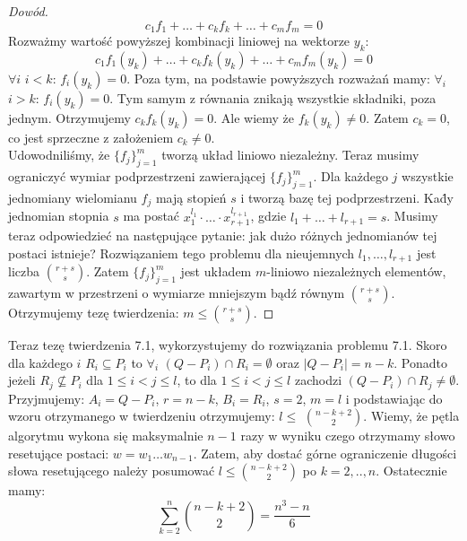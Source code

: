 \documentclass[12pt,a4paper]{article}
\begin{document}
\begin{proof}[Dow\'od]
\begin{equation}
 c_{1}f_{1}+\ldots+c_{k}f_{k}+\ldots+c_{m}f_{m}=0
\end{equation} 
Rozwa\.zmy warto\'s\'c powy\.zszej kombinacji liniowej na wektorze $y_{k}$: 
\begin{equation}
c_{1}f_{1}(y_{k})+\ldots+c_{k}f_{k}(y_{k})+\ldots+c_{m}f_{m}(y_{k})=0 
\end{equation}
$\forall i$ $i<k$: $f_{i}(y_{k})=0$. Poza tym, na podstawie powy\.zszych rozwa\.za\'n mamy: $\forall_{i}$ $i>k$: $f_{i}(y_{k})=0$. Tym samym z r\'ownania znikaj\k{a} wszystkie sk{\l}adniki, poza jednym. Otrzymujemy $c_{k}f_{k}(y_{k})=0$. Ale wiemy \.ze $f_{k}(y_{k})\neq0$. Zatem $c_{k}=0$, co jest sprzeczne  z za{\l}o\.zeniem $c_{k}\neq0$.\\
Udowodnili\'smy, \.ze $\{f_{j}\}_{j=1}^{m}$ tworz\k{a} uk{\l}ad liniowo niezale\.zny. Teraz musimy ograniczy\'c wymiar podprzestrzeni zawieraj\k{a}cej $\{f_{j}\}_{j=1}^{m}$. Dla ka\.zdego $j$ wszystkie jednomiany wielomianu $f_{j}$ maj\k{a} stopie\'n $s$ i tworz\k{a} baz\k{e} tej podprzestrzeni. Ka\.dy jednomian stopnia $s$ ma posta\'c $x_{1}^{l_{1}}\cdot\ldots\cdot x_{r+1}^{l_{r+1}}$, gdzie $l_{1}+\ldots+l_{r+1}=s$. Musimy teraz odpowiedzie\'c na nast\k{e}puj\k{a}ce pytanie: jak du\.zo r\'o\.znych jednomian\'ow tej postaci istnieje? Rozwi\k{a}zaniem tego problemu dla nieujemnych $l_{1},\ldots,l_{r+1}$ jest liczba ${r+s}\choose{s}$. Zatem $\{f_{j}\}_{j=1}^{m}$ jest uk{\l}adem $m$-liniowo niezale\.znych element\'ow, zawartym w przestrzeni o wymiarze mniejszym b\k{a}d\'z r\'ownym ${r+s}\choose{s}$. Otrzymujemy tez\k{e} twierdzenia: $m\leq{{r+s}\choose{s}}$.
\end{proof}

Teraz tez\k{e} twierdzenia 7.1, wykorzystujemy do rozwi\k{a}zania problemu 7.1. Skoro dla ka\.zdego $i$ $R_{i}\subseteq P_{i}$ to $\forall_{i}$ $(Q-P_{i})\cap R_{i}=\emptyset$ oraz $|Q-P_{i}|=n-k$. Ponadto je\.zeli $R_{j}\not\subseteq P_{i}$ dla $1\leq i<j\leq l$, to dla $1\leq i<j\leq l$ zachodzi $(Q-P_{i})\cap R_{j}\neq\emptyset$. Przyjmujemy: $A_{i}=Q-P_{i}$, $r=n-k$, $B_{i}=R_{i}$, $s=2$, $m=l$ i podstawiaj\k{a}c do wzoru otrzymanego w twierdzeniu otrzymujemy: $l\leq$ ${n-k+2}\choose{2}$. Wiemy, \.ze p\k{e}tla algorytmu wykona si\k{e} maksymalnie $n-1$ razy w wyniku czego otrzymamy s{\l}owo resetuj\k{a}ce postaci: $w=w_{1}\ldots w_{n-1}$. Zatem, aby dosta\'c g\'orne ograniczenie d{\l}ugo\'sci s{\l}owa resetuj\k{a}cego nale\.zy posumowa\'c $l\leq{{n-k+2}\choose{2}}$ po $k=2,..,n$. Ostatecznie mamy: 
\begin{equation}
\sum_{k=2}^{n}{{n-k+2}\choose{2}}=\frac{n^{3}-n}{6}
\end{equation}
\end{document}
